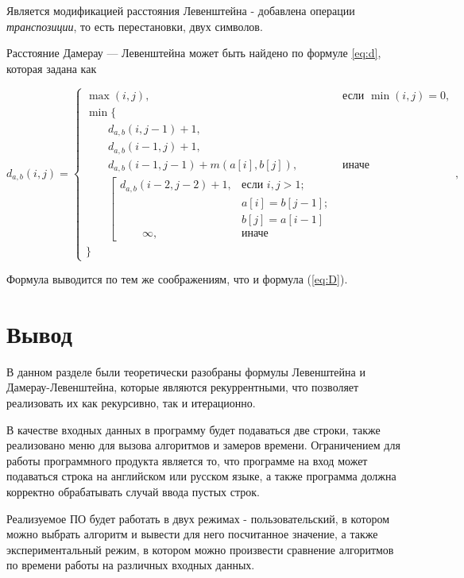 Является модификацией расстояния Левенштейна - добавлена операции \textit{транспозиции}, то есть перестановки, двух символов.

Расстояние Дамерау — Левенштейна может быть найдено по формуле \ref{eq:d}, которая задана как


\begin{equation}
	\label{eq:d}
	d_{a,b}(i, j) = \begin{cases}
		\max(i, j), &\text{если }\min(i, j) = 0,\\
		\min \lbrace \\
			\qquad d_{a,b}(i, j-1) + 1,\\
			\qquad d_{a,b}(i-1, j) + 1,\\
			\qquad d_{a,b}(i-1, j-1) + m(a[i], b[j]), &\text{иначе}\\
			\qquad \left[ \begin{array}{cc}d_{a,b}(i-2, j-2) + 1, &\text{если }i,j > 1;\\
			\qquad &\text{}a[i] = b[j-1]; \\
			\qquad &\text{}b[j] = a[i-1]\\
			\qquad \infty, & \text{иначе}\end{array}\right.\\
		\rbrace
		\end{cases},
\end{equation}

Формула выводится по тем же соображениям, что и формула (\ref{eq:D}).


\section{Вывод}
В данном разделе были теоретически разобраны формулы Левенштейна и Дамерау-Левенштейна, которые являются рекуррентными, что позволяет реализовать их как рекурсивно, так и итерационно.

В качестве входных данных в программу будет подаваться две строки, также реализовано меню для вызова алгоритмов и замеров времени. Ограничением для работы программного продукта является то, что программе на вход может подаваться строка на английском или русском языке, а также программа должна корректно обрабатывать случай ввода пустых строк. 

Реализуемое ПО будет работать в двух режимах - пользовательский, в котором можно выбрать алгоритм и вывести для него посчитанное значение, а также экспериментальный режим, в котором можно произвести сравнение алгоритмов по времени работы на различных входных данных. 
